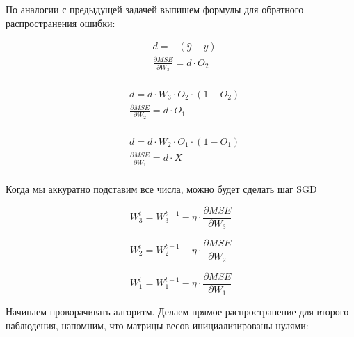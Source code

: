 \begin{sol}
По аналогии с предыдущей задачей выпишем формулы для обратного распространения ошибки:

\begin{minipage}{.2\linewidth}
	\begin{equation*} 
		\begin{aligned}
			&  d = - (\hat{y} - y) \\
			&  \frac{\partial MSE}{\partial W_3} = d \cdot O_2  \\
		\end{aligned}
	\end{equation*}
\end{minipage} \hfill
\begin{minipage}{.35\linewidth}
	\begin{equation*} 
		\begin{aligned}
			&  d = d \cdot W_3 \cdot O_2 \cdot (1 - O_2)  \\
			&  \frac{\partial MSE}{\partial W_2} = d \cdot O_1 \\
		\end{aligned}
	\end{equation*}
\end{minipage} \hfill
\begin{minipage}{.35\linewidth}
	\begin{equation*} 
	\begin{aligned}
	&  d = d \cdot W_2 \cdot O_1 \cdot (1 - O_1)  \\
	&  \frac{\partial MSE}{\partial W_1} = d \cdot X \\
	\end{aligned}
	\end{equation*}
\end{minipage}

Когда мы аккуратно подставим все числа, можно будет сделать шаг SGD

\begin{minipage}{.28\textwidth}
    \[  W_3^t = W_3^{t-1} - \eta \cdot \frac{\partial MSE}{\partial W_3}  \]
\end{minipage}
\begin{minipage}{.3\textwidth}
	\[  W_2^t = W_2^{t-1} - \eta \cdot \frac{\partial MSE}{\partial W_2}  \]
\end{minipage}
\begin{minipage}{.35\textwidth}
	\[  W_1^t = W_1^{t-1} - \eta \cdot \frac{\partial MSE}{\partial W_1}  \]
\end{minipage}

Начинаем проворачивать алгоритм. Делаем прямое распространение для второго наблюдения, напомним, что матрицы весов инициализированы нулями:


\end{sol}
